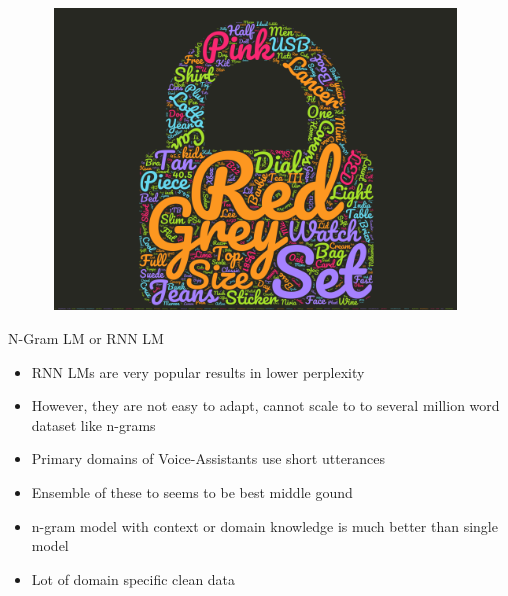 \documentclass{beamer}
\begin{document}
\begin{frame}
	\begin{figure}
	   \includegraphics[width=11cm, height=8cm]{figs/word_cloud_gis.png}
	\end{figure}
\end{frame}


\begin{frame}{N-Gram LM or RNN LM}
	\begin{itemize}
		\item RNN LMs are very popular results in lower perplexity
		\item However, they are not easy to adapt, cannot scale to to several million word dataset like n-grams
		\item Primary domains of Voice-Assistants use short utterances
		\item Ensemble of these to seems to be best middle gound
		\item n-gram model with context or domain knowledge is much better than single model
		\item Lot of domain specific clean data
	\end{itemize}
\end{frame}
\end{document}
